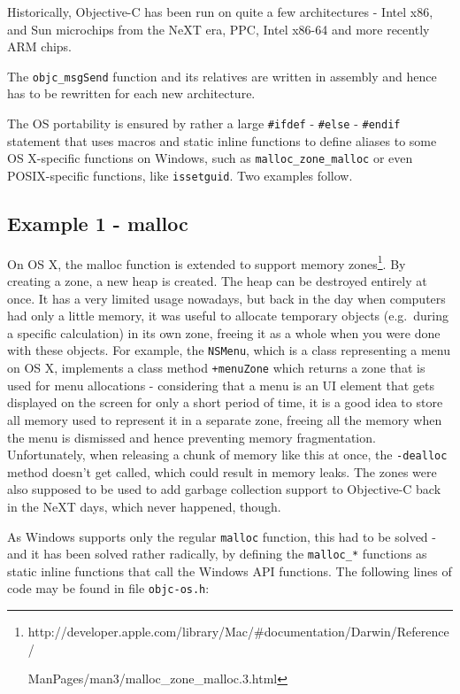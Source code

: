 Historically, Objective-C has been run on quite a few architectures - Intel x86, and Sun microchips from the NeXT era, PPC, Intel x86-64 and more recently ARM chips.

The \verb=objc_msgSend= function and its relatives are written in assembly and hence has to be rewritten for each new architecture.

The OS portability is ensured by rather a large \verb=#ifdef= - \verb=#else= - \verb=#endif= statement that uses macros and static inline functions to define aliases to some OS X-specific functions on Windows, such as \verb=malloc_zone_malloc= or even POSIX-specific functions, like \verb=issetguid=. Two examples follow.

\subsection{Example 1 - malloc}
On OS X, the malloc function is extended to support memory zones\footnote{http://developer.apple.com/library/Mac/\#documentation/Darwin/Reference/

ManPages/man3/malloc\_zone\_malloc.3.html}. By creating a zone, a new heap is created. The heap can be destroyed entirely at once. It has a very limited usage nowadays, but back in the day when computers had only a little memory, it was useful to allocate temporary objects (e.g.\ during a specific calculation) in its own zone, freeing it as a whole when you were done with these objects. For example, the \verb=NSMenu=, which is a class representing a menu on OS X, implements a class method \verb=+menuZone= which returns a zone that is used for menu allocations - considering that a menu is an UI element that gets displayed on the screen for only a short period of time, it is a good idea to store all memory used to represent it in a separate zone, freeing all the memory when the menu is dismissed and hence preventing memory fragmentation. Unfortunately, when releasing a chunk of memory like this at once, the \verb=-dealloc= method doesn't get called, which could result in memory leaks. The zones were also supposed to be used to add garbage collection support to Objective-C back in the NeXT days, which never happened, though.

As Windows supports only the regular \verb=malloc= function, this had to be solved - and it has been solved rather radically, by defining the \verb=malloc_*= functions as static inline functions that call the Windows API functions. The following lines of code may be found in file \verb=objc-os.h=:

